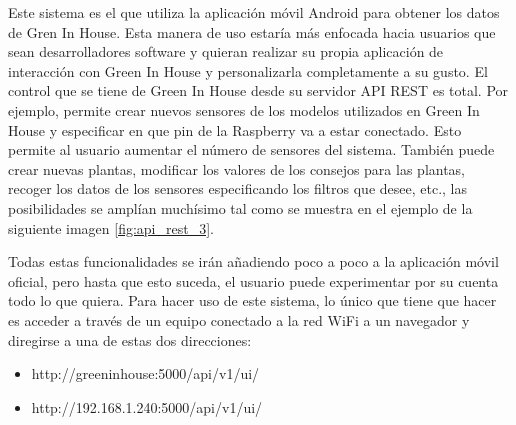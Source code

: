 Este sistema es el que utiliza la aplicación móvil Android para obtener los datos de Gren In House. Esta manera de uso estaría más enfocada hacia usuarios que sean desarrolladores software y quieran realizar su propia aplicación de interacción con Green In House y personalizarla completamente a su gusto. El control que se tiene de Green In House desde su servidor API REST es total. Por ejemplo, permite crear nuevos sensores de los modelos utilizados en Green In House y especificar en que pin de la Raspberry va a estar conectado. Esto permite al usuario aumentar el número de sensores del sistema. También puede crear nuevas plantas, modificar los valores de los consejos para las plantas, recoger los datos de los sensores especificando los filtros que desee, etc., las posibilidades se amplían muchísimo tal como se muestra en el ejemplo de la siguiente imagen \ref{fig:api_rest_3}.

Todas estas funcionalidades se irán añadiendo poco a poco a la aplicación móvil oficial, pero hasta que esto suceda, el usuario puede experimentar por su cuenta todo lo que quiera. Para hacer uso de este sistema, lo único que tiene que hacer es acceder a través de un equipo conectado a la red WiFi a un navegador y diregirse a una de estas dos direcciones:
\begin{itemize}
    \item http://greeninhouse:5000/api/v1/ui/
    \item http://192.168.1.240:5000/api/v1/ui/
\end{itemize}
